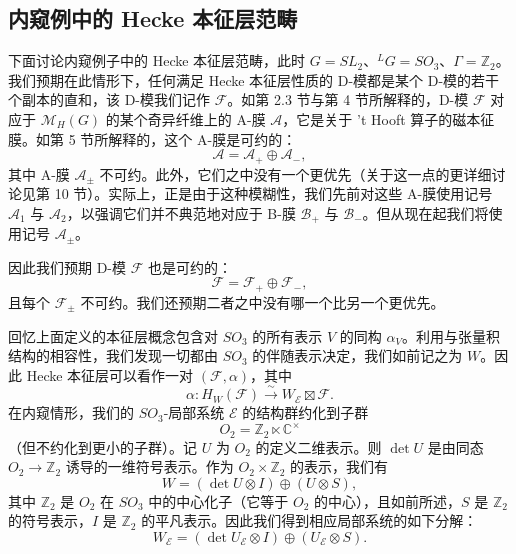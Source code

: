 \subsection{内窥例中的 Hecke 本征层范畴}

下面讨论内窥例子中的 Hecke 本征层范畴，此时 $G = SL_2$、${}^LG = SO_3$、$\Gamma = \mathbb{Z}_2$。我们预期在此情形下，任何满足 Hecke 本征层性质的 D-模都是某个 D-模的若干个副本的直和，该 D-模我们记作 $\mathcal{F}$。如第 2.3 节与第 4 节所解释的，D-模 $\mathcal{F}$ 对应于 $\mathcal{M}_H(G)$ 的某个奇异纤维上的 A-膜 $\mathcal{A}$，它是关于 't Hooft 算子的磁本征膜。如第 5 节所解释的，这个 A-膜是可约的：
\[
\mathcal{A} = \mathcal{A}_+\oplus\mathcal{A}_-,
\]
其中 A-膜 $\mathcal{A}_\pm$ 不可约。此外，它们之中没有一个更优先（关于这一点的更详细讨论见第 10 节）。实际上，正是由于这种模糊性，我们先前对这些 A-膜使用记号 $\mathcal{A}_1$ 与 $\mathcal{A}_2$，以强调它们并不典范地对应于 B-膜 $\mathcal{B}_+$ 与 $\mathcal{B}_-$。但从现在起我们将使用记号 $\mathcal{A}_\pm$。

因此我们预期 D-模 $\mathcal{F}$ 也是可约的：
\[
\mathcal{F} = \mathcal{F}_+\oplus\mathcal{F}_-,
\]
且每个 $\mathcal{F}_\pm$ 不可约。我们还预期二者之中没有哪一个比另一个更优先。

回忆上面定义的本征层概念包含对 $SO_3$ 的所有表示 $V$ 的同构 $\alpha_V$。利用与张量积结构的相容性，我们发现一切都由 $SO_3$ 的伴随表示决定，我们如前记之为 $W$。因此 Hecke 本征层可以看作一对 $(\mathcal{F},\alpha)$，其中
\begin{equation}\tag{6.7}
\alpha : H_W(\mathcal{F})\xrightarrow{\sim} W_{\mathcal{E}}\boxtimes\mathcal{F}.
\end{equation}
在内窥情形，我们的 $SO_3$-局部系统 $\mathcal{E}$ 的结构群约化到子群
\[
O_2 = \mathbb{Z}_2\ltimes\mathbb{C}^\times
\]
（但不约化到更小的子群）。记 $U$ 为 $O_2$ 的定义二维表示。则 $\det U$ 是由同态 $O_2\to\mathbb{Z}_2$ 诱导的一维符号表示。作为 $O_2\times\mathbb{Z}_2$ 的表示，我们有
\[
W = (\det U\otimes I)\oplus(U\otimes S),
\]
其中 $\mathbb{Z}_2$ 是 $O_2$ 在 $SO_3$ 中的中心化子（它等于 $O_2$ 的中心），且如前所述，$S$ 是 $\mathbb{Z}_2$ 的符号表示，$I$ 是 $\mathbb{Z}_2$ 的平凡表示。因此我们得到相应局部系统的如下分解：
\begin{equation}\tag{6.8}
W_{\mathcal{E}} = (\det U_{\mathcal{E}}\otimes I)\oplus(U_{\mathcal{E}}\otimes S).
\end{equation}


